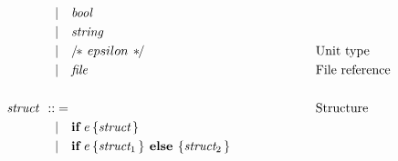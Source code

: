 \begin{fleqn}
\begin{align*}
                 & \hspace{-0.1cm}                  &    & | \ \ \ \textit{bool}                                                                                                                                            &  &                                    \\
                 & \hspace{-0.1cm}                  &    & | \ \ \ \textit{string}                                                                                                                                          &  &                                    \\
                 & \hspace{-0.1cm}                  &    & | \ \ \ /\!\!* \, epsilon \, *\!\!/                                                                                                                              &  & \hspace*{2cm}\text{Unit type}      \\
                 & \hspace{-0.1cm}                  &    & | \ \ \ \textit{file}                                                                                                                                            &  & \hspace*{2cm}\text{File reference} \\
                 & \hspace{-0.1cm}                  &    &                                                                                                                                                                  &  &                                    \\
                 & \textit{struct} \hspace{-0.1cm}  & :: & =                                                                                                                                                                &  & \hspace*{2cm}\text{Structure}      \\
                 & \hspace{-0.1cm}                  &    & | \ \ \ \textbf{if} \ e \, \{ \textit{struct} \, \}                                                                                                              &  &                                    \\
                 & \hspace{-0.1cm}                  &    & | \ \ \ \textbf{if} \ e \, \{ \textit{struct}_1 \, \} \textbf{ else } \{ \textit{struct}_2 \, \}                                                                 &  &                                    \\

\end{align*}
\end{fleqn}
